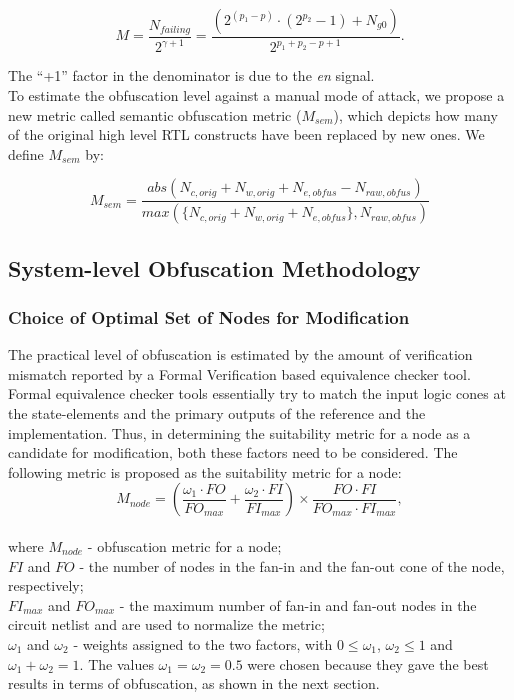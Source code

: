 \documentclass{optica-article}
\begin{document}
\begin{equation}
    \label{equation:3}
    M=\frac{N_{failing}}{2^{\gamma+1}} =\frac{(2^{(p_1- p)}\cdot(2^{p_2} - 1)+N_{g0})}{2^{p_1+p_2-p+1}}.
\end{equation}

\indent The “+1” factor in the denominator is due to the \textit{en} signal.\\
\indent To estimate the obfuscation level against a manual mode of attack, we propose a new metric called semantic obfuscation metric ($M_{sem}$), which depicts how many of the original high level RTL constructs have been replaced by new ones. We define $M_{sem}$ by:

\begin{equation} %
    \label{equation:4}
    M_{sem}=\frac{abs(N_{c,orig}+N_{w,orig}+N_{e,obfus}-N_{raw,obfus})}{max(\{N_{c,orig}+N_{w,orig}+N_{e,obfus}\},N_{raw,obfus})}
\end{equation}


\subsection{System-level Obfuscation Methodology}

\subsubsection{Choice of Optimal Set of Nodes for Modification}

The practical level of obfuscation is estimated by the amount of verification mismatch reported by a Formal Verification based equivalence checker tool. Formal equivalence checker tools essentially try to match the input logic cones at the state-elements and the primary outputs of the reference and the implementation. Thus, in determining the suitability metric for a node as a candidate for modification, both these factors need to be considered. The following metric is proposed as the suitability metric for a node:$$M_{node}=\left(\frac{\omega_1\cdot FO}{FO_{max}}+\frac{\omega_2\cdot FI}{FI_{max}}\right)\times\frac{FO\cdot FI}{FO_{max}\cdot FI_{max}},$$\\
where $M_{node}$ - obfuscation metric for a node;\\
$FI$ and $FO$ - the number of nodes in the fan-in and the fan-out cone of the node, respectively;\\
$FI_{max}$ and $FO_{max}$ - the maximum number of fan-in and fan-out nodes in the circuit netlist and are used to normalize the metric;\\
$\omega_1$ and $\omega_2$ - weights assigned to the two factors, with $0\leq\omega_1$, $\omega_2\leq1$ and $\omega_1 + \omega_2 = 1$. The values $\omega_1 = \omega_2 = 0.5$ were chosen because they gave the best results in terms of obfuscation, as shown in the next section.
\end{document}
